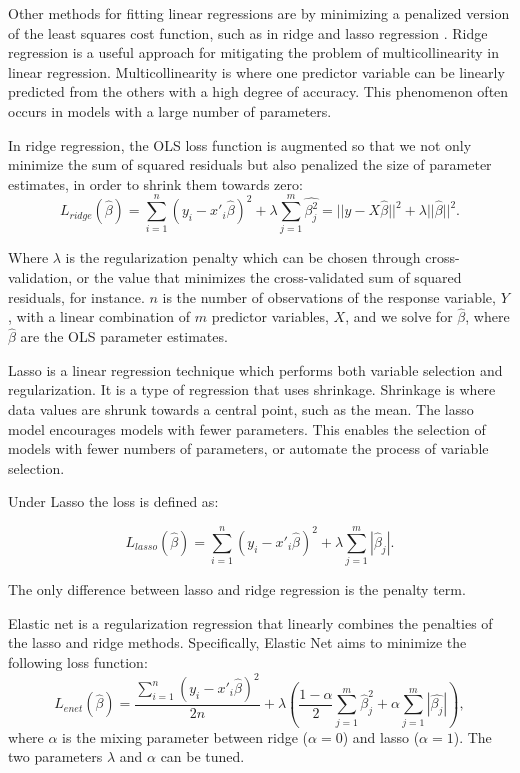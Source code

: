 Other methods for fitting linear regressions are by minimizing a penalized version of the least squares cost function, such as in ridge and lasso regression \cite{Tibshirani1996a, GeladiPaul1994Mrac}. Ridge regression is a useful approach for mitigating the problem of multicollinearity in linear regression. Multicollinearity is where one predictor variable can be linearly predicted from the others with a high degree of accuracy. This phenomenon often occurs in models with a large number of parameters. 

In ridge regression, the OLS loss function is augmented so that we not only minimize the sum of squared residuals but also penalized the size of parameter estimates, in order to shrink them towards zero:
\begin{equation}
    L_{ridge}(\hat{\beta})=\sum^n_{i=1}(y_i-x'_i\hat{\beta})^2+\lambda\sum^m_{j=1}\hat{\beta^2_j}=||y-X\hat{\beta}||^2+\lambda||\hat{\beta}||^2.
\end{equation}

Where $\lambda$ is the regularization penalty which can be chosen through cross-validation, or the value that minimizes the cross-validated sum of squared residuals, for instance. $n$ is the number of observations of the response variable, $Y$, with a linear combination of $m$ predictor variables, $X$, and we solve for $\hat{\beta}$, where $\hat{\beta}$ are the OLS parameter estimates.



Lasso is a linear regression technique which performs both variable selection and regularization. It is a type of regression that uses shrinkage. Shrinkage is where data values are shrunk towards a central point, such as the mean. The lasso model encourages models with fewer parameters. This enables the selection of models with fewer numbers of parameters, or automate the process of variable selection.

Under Lasso the loss is defined as:

\begin{equation}
    L_{lasso}(\hat{\beta})=\sum^n_{i=1}(y_i-x'_i\hat{\beta})^2+\lambda\sum^m_{j=1}|\hat{\beta}_j|.
\end{equation}

The only difference between lasso and ridge regression is the penalty term.

Elastic net is a regularization regression that linearly combines the penalties of the lasso and ridge methods. Specifically, Elastic Net aims to minimize the following loss function:
\begin{equation}
L_{enet}(\hat{\beta})=\frac{\sum^n_{i=1}(y_i-x'_i\hat{\beta})^2}{2n}+\lambda(\frac{1-\alpha}{2}\sum^m_{j=1}\hat{\beta}^2_j+\alpha\sum^m_{j=1}|\hat{\beta_j}|),
\end{equation}
where $\alpha$ is the mixing parameter between ridge ($\alpha=0$) and lasso ($\alpha=1$). The two parameters $\lambda$ and $\alpha$ can be tuned.


